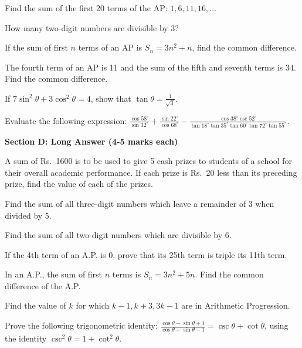 \documentclass[12pt,a4paper]{exam}
\begin{document}
\begin{questions}
\question[3] Find the sum of the first 20 terms of the AP: $1, 6, 11, 16, \dots$
\vspace{0.15cm}

\question[3] How many two-digit numbers are divisible by 3?
\vspace{0.15cm}

\question[3] If the sum of first $n$ terms of an AP is $S_n = 3n^2 + n$, find the common difference.
\vspace{0.15cm}

\question[3] The fourth term of an AP is 11 and the sum of the fifth and seventh terms is 34. Find the common difference.
\vspace{0.15cm}

\question[3] If $7 \sin^2 \theta + 3 \cos^2 \theta = 4$, show that $\tan \theta = \frac{1}{\sqrt{3}}$.
\vspace{0.15cm}

\question[3] Evaluate the following expression: $\frac{\cos 58^\circ}{\sin 32^\circ} + \frac{\sin 22^\circ}{\cos 68^\circ} - \frac{\cos 38^\circ \csc 52^\circ}{\tan 18^\circ \tan 35^\circ \tan 60^\circ \tan 72^\circ \tan 55^\circ}$.
\vspace{0.15cm}

\end{questions}
\bigskip
\noindent\textbf{\large Section D: Long Answer (4-5 marks each)}

\begin{questions}
\question[5] A sum of Rs.~1600 is to be used to give 5 cash prizes to students of a school for their overall academic performance. If each prize is Rs.~20 less than its preceding prize, find the value of each of the prizes.
\vspace{0.15cm}

\question[5] Find the sum of all three-digit numbers which leave a remainder of 3 when divided by 5.
\vspace{0.15cm}

\question[3] Find the sum of all two-digit numbers which are divisible by 6.
\vspace{0.15cm}

\question[3] If the 4th term of an A.P. is 0, prove that its 25th term is triple its 11th term.
\vspace{0.15cm}

\question[2] In an A.P., the sum of first $n$ terms is $S_n = 3n^2 + 5n$. Find the common difference of the A.P.
\vspace{0.15cm}

\question[2] Find the value of $k$ for which $k-1, k+3, 3k-1$ are in Arithmetic Progression.
\vspace{0.15cm}

\question[5] Prove the following trigonometric identity: $\frac{\cos \theta - \sin \theta + 1}{\cos \theta + \sin \theta - 1} = \csc \theta + \cot \theta$, using the identity $\csc^2 \theta = 1 + \cot^2 \theta$.
\vspace{0.15cm}

\end{questions}
\bigskip
\end{document}
